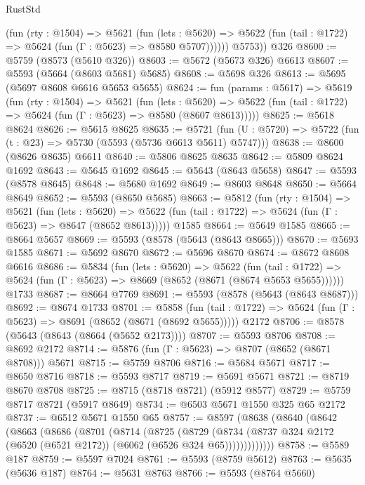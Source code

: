 \begin{lexlean}{RustStd}
\begin{coremodule}
            (fun (rty : @1504) =>
            @5621
              (fun (lets : @5620) =>
              @5622 (fun (tail : @1722) => @5624 (fun (Γ : @5623) => @8580 @5707))))))
        @5753))
    @326
@8600 := @5759 (@8573 (@5610 @326))
@8603 := @5672 (@5673 @326) @6613
@8607 := @5593 (@5664 (@8603 @5681) @5685)
@8608 := @5698 @326
@8613 := @5695 (@5697 @8608 @6616 @5653 @5655)
@8624 := fun (params : @5617) =>
  @5619
    (fun (rty : @1504) =>
    @5621
      (fun (lets : @5620) =>
      @5622 (fun (tail : @1722) => @5624 (fun (Γ : @5623) => @8580 (@8607 @8613)))))
@8625 := @5618 @8624
@8626 := @5615 @8625
@8635 := @5721 (fun (U : @5720) => @5722 (fun (t : @23) => @5730 (@5593 (@5736 @6613 @5611) @5747)))
@8638 := @8600 (@8626 @8635) @6611
@8640 := @5806 @8625 @8635
@8642 := @5809 @8624 @1692
@8643 := @5645 @1692
@8645 := @5643 (@8643 @5658)
@8647 := @5593 (@8578 @8645)
@8648 := @5680 @1692
@8649 := @8603 @8648
@8650 := @5664 @8649
@8652 := @5593 (@8650 @5685)
@8663 := @5812
    (fun (rty : @1504) =>
    @5621
      (fun (lets : @5620) =>
      @5622 (fun (tail : @1722) => @5624 (fun (Γ : @5623) => @8647 (@8652 @8613)))))
    @1585
@8664 := @5649 @1585
@8665 := @8664 @5657
@8669 := @5593 (@8578 (@5643 (@8643 @8665)))
@8670 := @5693 @1585
@8671 := @5692 @8670
@8672 := @5696 @8670
@8674 := @8672 @8608 @6616
@8686 := @5834
    (fun (lets : @5620) =>
    @5622
      (fun (tail : @1722) => @5624 (fun (Γ : @5623) => @8669 (@8652 (@8671 (@8674 @5653 @5655))))))
    @1733
@8687 := @8664 @7769
@8691 := @5593 (@8578 (@5643 (@8643 @8687)))
@8692 := @8674 @1733
@8701 := @5858
    (fun (tail : @1722) => @5624 (fun (Γ : @5623) => @8691 (@8652 (@8671 (@8692 @5655)))))
    @2172
@8706 := @8578 (@5643 (@8643 (@8664 (@5652 @2173))))
@8707 := @5593 @8706
@8708 := @8692 @2172
@8714 := @5876 (fun (Γ : @5623) => @8707 (@8652 (@8671 @8708))) @5671
@8715 := @5759 @8706
@8716 := @5684 @5671
@8717 := @8650 @8716
@8718 := @5593 @8717
@8719 := @5691 @5671
@8721 := @8719 @8670 @8708
@8725 := @8715 (@8718 @8721) (@5912 @8577)
@8729 := @5759 @8717 @8721 (@5917 @8649)
@8734 := @6503 @5671 @1550 @325 @65 @2172
@8737 := @6512 @5671 @1550 @65
@8757 := @8597
    (@8638
      (@8640
        (@8642
          (@8663
            (@8686
              (@8701
                (@8714
                  (@8725
                    (@8729
                      (@8734
                        (@8737 @324 @2172 (@6520 (@6521 @2172)) (@6062 (@6526 @324 @65)))))))))))))
@8758 := @5589 @187
@8759 := @5597 @7024
@8761 := @5593 (@8759 @5612)
@8763 := @5635 (@5636 @187)
@8764 := @5631 @8763
@8766 := @5593 (@8764 @5660)

\end{coremodule}
\end{lexlean}
